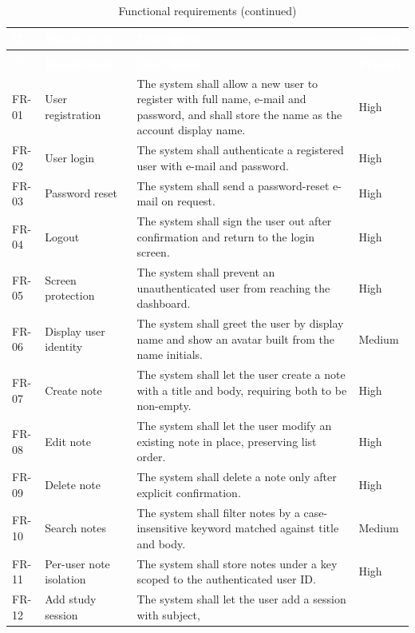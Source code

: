 \documentclass[12pt,a4paper,oneside]{report}
\begin{document}
\begin{longtable}{@{}p{1.5cm}p{4.6cm}p{6.3cm}p{2.1cm}@{}}
\caption{Functional requirements} \label{tab:fr} \\
\toprule
\rowcolor{tblhead} \textcolor{white}{\textbf{ID}} &
\textcolor{white}{\textbf{Requirement}} &
\textcolor{white}{\textbf{Description}} &
\textcolor{white}{\textbf{Priority}} \\
\midrule
\endfirsthead
\caption[]{Functional requirements (continued)} \\
\toprule
\rowcolor{tblhead} \textcolor{white}{\textbf{ID}} &
\textcolor{white}{\textbf{Requirement}} &
\textcolor{white}{\textbf{Description}} &
\textcolor{white}{\textbf{Priority}} \\
\midrule
\endhead
FR-01 & User registration & The system shall allow a new user to register with full
   name, e-mail and password, and shall store the name as the account display name. & High \\
FR-02 & User login & The system shall authenticate a registered user with e-mail and
   password. & High \\
FR-03 & Password reset & The system shall send a password-reset e-mail on request. & High \\
FR-04 & Logout & The system shall sign the user out after confirmation and return to
   the login screen. & High \\
FR-05 & Screen protection & The system shall prevent an unauthenticated user from
   reaching the dashboard. & High \\
FR-06 & Display user identity & The system shall greet the user by display name and
   show an avatar built from the name initials. & Medium \\
FR-07 & Create note & The system shall let the user create a note with a title and
   body, requiring both to be non-empty. & High \\
FR-08 & Edit note & The system shall let the user modify an existing note in place,
   preserving list order. & High \\
FR-09 & Delete note & The system shall delete a note only after explicit
   confirmation. & High \\
FR-10 & Search notes & The system shall filter notes by a case-insensitive keyword
   matched against title and body. & Medium \\
FR-11 & Per-user note isolation & The system shall store notes under a key scoped to
   the authenticated user ID. & High \\
FR-12 & Add study session & The system shall let the user add a session with subject,

\end{longtable}
\end{document}
